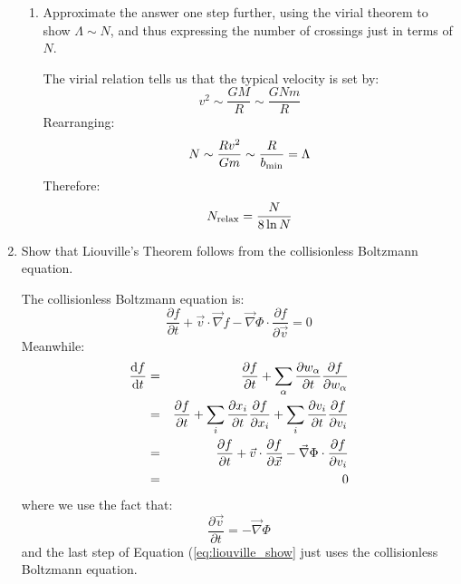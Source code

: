 \begin{enumerate}
\begin{enumerate}
\item Approximate the answer one step further, using the
virial theorem to show $\Lambda \sim N$, and thus expressing the
number of crossings just in terms of $N$.

\begin{answer}
The virial relation tells us that the typical velocity is set by:
\begin{equation}
v^2 \sim \frac{GM}{R} \sim \frac{GN m}{R}
\end{equation}
Rearranging:
\begin{equation}
N \sim \frac{R v^2}{Gm} \sim \frac{R}{b_{\rm min}} = \Lambda
\end{equation}
Therefore:
\begin{equation}
N_{\rm relax} = \frac{N}{8 \ln N}
\end{equation}
\end{answer}
\end{enumerate}

\item Show that Liouville's Theorem follows from the collisionless
Boltzmann equation. 

\begin{answer}
The collisionless Boltzmann equation is:
\begin{equation}
 \frac{\partial f}{\partial t} + \vec{v}\cdot\vec{\nabla} f -
\vec{\nabla}\Phi\cdot\frac{\partial f}{\partial \vec{v}} = 0
\end{equation}
Meanwhile:
\begin{eqnarray}
\label{eq:liouville_show}
\frac{{\rm d}f}{{\rm d}t} &=& 
\frac{\partial f}{\partial t}
+ \sum_\alpha \frac{\partial w_\alpha}{\partial t} \frac{\partial f}{\partial w_\alpha} \cr
&=& 
\frac{\partial f}{\partial t}
+ \sum_i \frac{\partial x_i}{\partial t} \frac{\partial f}{\partial x_i}
+ \sum_i \frac{\partial v_i}{\partial t} \frac{\partial f}{\partial v_i} \cr
&=& 
\frac{\partial f}{\partial t}
+ \vec{v} \cdot \frac{\partial f}{\partial \vec{x}}
- \vec{\nabla} \Phi \cdot \frac{\partial f}{\partial v_i} \cr
&=& 0
\end{eqnarray}
where we use the fact that:
\begin{equation}
\frac{\partial \vec{v}}{\partial t} = - \vec{\nabla} \Phi
\end{equation}
and the last step of Equation (\ref{eq:liouville_show} just uses the
collisionless Boltzmann equation. 
\end{answer}


\end{enumerate}
